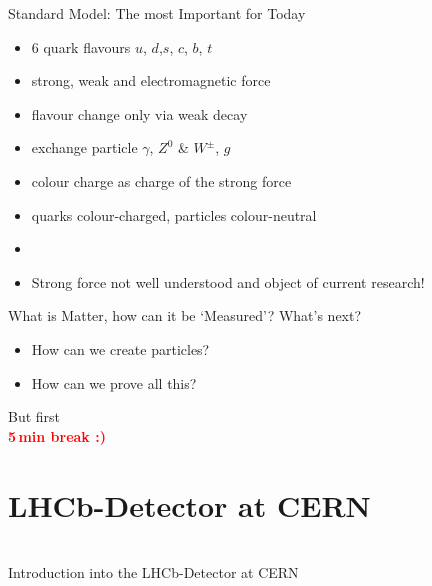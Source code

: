 \begin{frame}{Standard Model: The most Important for Today}
\begin{itemize}
    \item 6 quark flavours $u$, $d$,$s$, $c$, $b$, $t$
    \item strong, weak and electromagnetic force
    \item flavour change only via weak decay
    \item exchange particle $\gamma$, $Z^0$ \& $W^{\pm}$, $g$
    \item colour charge as charge of the strong force
    \item quarks colour-charged, particles colour-neutral
    \item []
    \item[\ding{43}] Strong force not well understood and object of current research!
\end{itemize}
    
\end{frame}
  \begin{frame}{What is Matter, how can it be ‘Measured’?}\Large
What's next?
 \begin{itemize}
     \item How can we create particles?
     \item How can we prove all this?
 \end{itemize}
\begin{center} \pause
 
But first \\   \textbf{\textcolor{red}{5\,min break :)}
}
\end{center}  
\end{frame}
   \section{LHCb-Detector at CERN}
\begin{frame}[plain]

\begin{center} 
  \huge{   }\\
   \Large{Introduction into the LHCb-Detector at CERN}

\end{center}
\end{frame}



